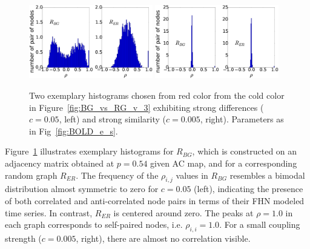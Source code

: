 \documentclass[fleqn,10pt]{wlpeerj}
\begin{document}
\begin{figure}[ht] \centering
	 \includegraphics[width=0.48\textwidth]{Figures/histo_r_054_v_3_c_005_fhn} 
	 \includegraphics[width=0.48\textwidth]{Figures/histo_r_054_v_3_c_0005_fhn} 
   	 \caption{Two exemplary histograms chosen from red color from the cold color in Figure~\ref{fig:BG_vs_RG_v_3}
exhibiting strong differences ($c=0.05$, left) and strong similarity ($c=0.005$, right). Parameters as in
Fig~\ref{fig:BOLD_e_s}.} 
    \label{fig:histo_ex_v_3}
\end{figure} 

Figure~\ref{fig:histo_ex_v_3} illustrates exemplary histograms for $R_{BG}$, which is constructed on an
adjacency matrix obtained at $p=0.54$ given AC map, and for a corresponding random graph $R_{ER}$. The frequency of
the $\rho_{i,j}$ values in $R_{BG}$ resembles a bimodal distribution almost symmetric to zero for  $c=0.05$ (left),
indicating the presence of both correlated and anti-correlated node pairs in terms of their FHN modeled
time series. In contrast, $R_{ER}$ is centered around zero. The peaks at $\rho=1.0$ in each graph corresponds to
self-paired nodes, i.e. $\rho_{i,i}=1.0$.  For a small coupling strength ($c=0.005$, right), there are almost no
correlation visible.
\end{document}
